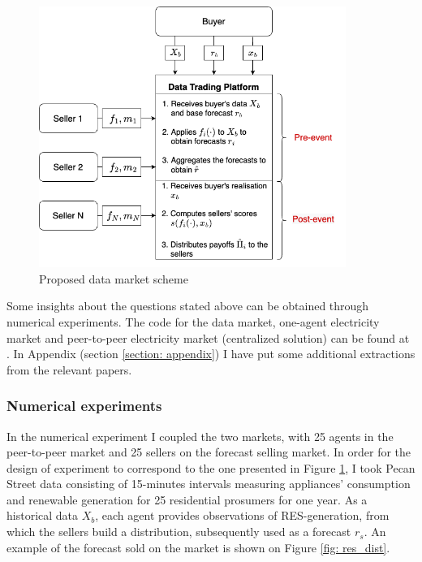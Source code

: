 \documentclass{article}
\begin{document}
\begin{figure}
    \centering
    \includegraphics[width = 100mm]{data_market.png}
    \caption{Proposed data market scheme}
    \label{fig: data_market}
\end{figure}




Some insights about the questions stated above can be obtained through numerical experiments. The code for the data market, one-agent electricity market and peer-to-peer electricity market (centralized solution) can be found at \cite{github}. In Appendix (section \ref{section: appendix}) I have put some additional extractions from the relevant papers.

\subsubsection{Numerical experiments}
In the numerical experiment I coupled the two markets, with 25 agents in the peer-to-peer market and 25 sellers on the forecast selling market. In order for the design of experiment to correspond to the one presented in Figure \ref{fig: data_market}, I took Pecan Street \cite{pecan_street} data consisting of 15-minutes intervals measuring appliances' consumption and renewable generation for 25 residential prosumers for one year. As a historical data $X_b$, each agent provides observations of RES-generation, from which the sellers build a distribution, subsequently used as a forecast $r_s$. An example of the forecast sold on the market is shown on Figure \ref{fig: res_dist}.  
\end{document}
